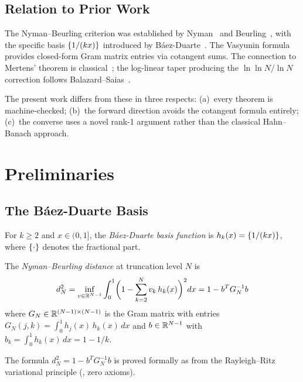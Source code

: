 \documentclass[11pt,a4paper]{article}
\begin{document}
\subsection{Relation to Prior Work}

The Nyman--Beurling criterion was established by Nyman~\cite{nyman1950}
and Beurling~\cite{beurling1955}, with the specific basis $\{1/(kx)\}$
introduced by B\'aez-Duarte~\cite{baezduarte2003}. The Vasyunin
formula~\cite{vasyunin1995} provides closed-form Gram matrix entries
via cotangent sums. The connection to Mertens' theorem is
classical~\cite{mertens1897}; the log-linear taper producing the
$\ln\ln N / \ln N$ correction follows Balazard--Saias~\cite{balazard2000}.

The present work differs from these in three respects: (a)~every theorem
is machine-checked; (b)~the forward direction avoids the cotangent
formula entirely; (c)~the converse uses a novel rank-1 argument rather
than the classical Hahn--Banach approach.

\section{Preliminaries}
\label{sec:prelim}

\subsection{The B\'aez-Duarte Basis}

\begin{definition}
For $k \geq 2$ and $x \in (0,1]$, the \emph{B\'aez-Duarte basis function}
is $h_k(x) = \{1/(kx)\}$, where $\{\cdot\}$ denotes the
fractional part.
\end{definition}

\begin{definition}
The \emph{Nyman--Beurling distance} at truncation level $N$ is
\[
  d_N^2 = \inf_{v \in \mathbb{R}^{N-1}} \int_0^1
    \biggl(1 - \sum_{k=2}^{N} v_k\,h_k(x)\biggr)^2 dx
  = 1 - b^T G_N^{-1} b
\]
where $G_N \in \mathbb{R}^{(N-1) \times (N-1)}$ is the Gram matrix with entries
$G_N(j,k) = \int_0^1 h_j(x)\,h_k(x)\,dx$ and
$b \in \mathbb{R}^{N-1}$ with $b_k = \int_0^1 h_k(x)\,dx = 1 - 1/k$.
\end{definition}

The formula $d_N^2 = 1 - b^T G_N^{-1} b$ is proved formally
as  from the Rayleigh--Ritz variational
principle (, zero axioms).
\end{document}
